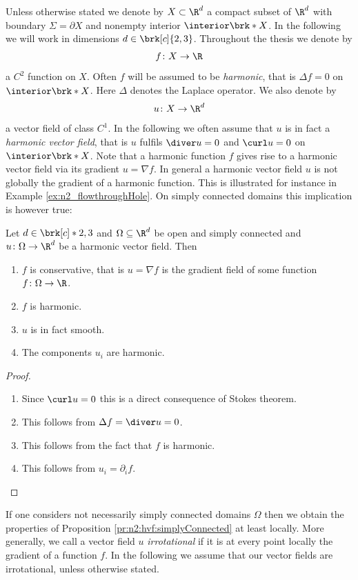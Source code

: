 Unless otherwise stated we denote by $X\subset\R^d$ a compact subset of $\R^d$ with boundary $\Sigma=\partial X$ and nonempty interior
$\openX$.
In the following we will work in dimensions $d\in\brk[c]{2,3}$.
Throughout the thesis we denote by
\begin{align*}
  f\colon X\to\R
\end{align*}
a $C^2$ function on $X$. Often $f$ will be assumed to be \emph{harmonic},
that is $\Delta f=0$ on $\openX$. Here $\Delta$ denotes the Laplace operator.
We also denote by
\begin{align*}
  u\colon X\to\R^d
\end{align*}
a vector field of class $C^1$.
In the following we often assume that $u$ is in fact a \emph{harmonic vector field}, that is $u$ fulfils
$\diver u=0$ and $\curl u=0$ on $\openX$.
Note that a harmonic function $f$ gives rise to a harmonic vector field via its gradient $u=\nabla f$.
In general a harmonic vector field $u$ is not globally the gradient of a harmonic function.
This is illustrated for instance in Example \ref{ex:n2_flowthroughHole}.
On simply connected domains this implication is however true:
\begin{proposition}\label{pr:n2:hvf:simplyConnected}
  Let $d\in\brk[c]*{2,3}$ and $\Omega\subseteq\R^d$ be open and simply connected and $u\colon\Omega\to\R^d$ be a harmonic vector field. Then
  \begin{enumerate}
    \item $f$ is conservative, that is
    $u=\nabla f$ is the gradient field of some
    function $f\colon\Omega\to\R$.
    \item $f$ is harmonic.
    \item $u$ is in fact smooth.
    \item The components $u_i$ are harmonic.
  \end{enumerate}
\end{proposition}
\begin{proof}
  \begin{enumerate}
    \item 
    Since $\curl u =0$ this is a direct consequence of Stokes theorem.
    \item This follows from $\Delta f = \diver u=0$.
    \item This follows from the fact that $f$ is harmonic.
    \item This follows from $u_i=\partial_if$.\qedhere
  \end{enumerate}
\end{proof}
If one considers not necessarily simply connected domains $\Omega$ then we obtain the
properties of Proposition \ref{pr:n2:hvf:simplyConnected} at least locally.
More generally, we call a vector field $u$ \emph{irrotational} if it is at every point locally the gradient of a function $f$.
In the following we assume that our vector fields are irrotational, unless otherwise stated.

